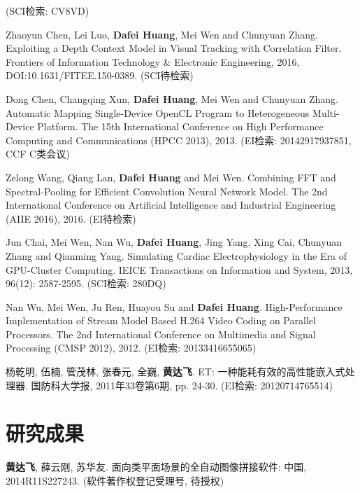 \begin{resume}
\begin{enumerate}[{[}1{]}]
  (SCI检索: CV8VD)
  \item Zhaoyun Chen, Lei Luo, \textbf{Dafei Huang}, Mei Wen and Chunyuan Zhang. 
  Exploiting a Depth Context Model in Visual Tracking with Correlation Filter. 
  Frontiers of Information Technology \& Electronic Engineering, 2016, DOI:10.1631/FITEE.150-0389.
  (SCI待检索)
  \item Dong Chen, Changqing Xun, \textbf{Dafei Huang}, Mei Wen and Chunyuan Zhang. 
  Automatic Mapping Single-Device OpenCL Program to Heterogeneous Multi-Device Platform. 
  The 15th International Conference on High Performance Computing and Communications (HPCC 2013), 2013.
  (EI检索: 20142917937851, CCF C类会议)
  \item Zelong Wang, Qiang Lan, \textbf{Dafei Huang} and Mei Wen. 
  Combining FFT and Spectral-Pooling for Efficient Convolution Neural Network Model. 
  The 2nd International Conference on Artificial Intelligence and Industrial Engineering (AIIE 2016), 2016.
  (EI待检索)
  \item Jun Chai, Mei Wen, Nan Wu, \textbf{Dafei Huang}, Jing Yang, Xing Cai, Chunyuan Zhang and Qianming Yang. 
  Simulating Cardiac Electrophysiology in the Era of GPU-Cluster Computing. 
  IEICE Transactions on Information and System, 2013, 96(12): 2587-2595.
  (SCI检索: 280DQ)
  \item Nan Wu, Mei Wen, Ju Ren, Huayou Su and \textbf{Dafei Huang}. 
  High-Performance Implementation of Stream Model Based H.264 Video Coding on Parallel Processors. 
  The 2nd International Conference on Multimedia and Signal Processing (CMSP 2012), 2012.
  (EI检索: 20133416655065)
  \item 杨乾明, 伍楠, 管茂林, 张春元, 全巍, \textbf{黄达飞}. 
  ET: 一种能耗有效的高性能嵌入式处理器. 
  国防科大学报, 2011年33卷第6期, pp. 24-30. 
  (EI检索: 20120714765514)
  \end{enumerate}

  \section*{研究成果} %
  \begin{enumerate}[{[}1{]}]
  \addtolength{\itemsep}{-.36\baselineskip}%
  \item \textbf{黄达飞}, 薛云刚, 苏华友.
  面向类平面场景的全自动图像拼接软件: 
  中国, 2014R11S227243. (软件著作权登记受理号, 待授权)
  \end{enumerate}
\end{resume}
